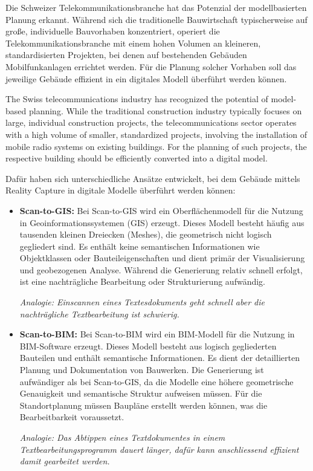 \begin{German}
    Die Schweizer Telekommunikationsbranche hat das Potenzial der modellbasierten Planung erkannt. Während sich die traditionelle Bauwirtschaft typischerweise auf große, individuelle Bauvorhaben konzentriert, operiert die Telekommunikationsbranche mit einem hohen Volumen an kleineren, standardisierten Projekten, bei denen auf bestehenden Gebäuden Mobilfunkanlagen errichtet werden. Für die Planung solcher Vorhaben soll das jeweilige Gebäude effizient in ein digitales Modell überführt werden können.
\end{German}

\begin{English}
    The Swiss telecommunications industry has recognized the potential of model-based planning. While the traditional construction industry typically focuses on large, individual construction projects, the telecommunications sector operates with a high volume of smaller, standardized projects, involving the installation of mobile radio systems on existing buildings. For the planning of such projects, the respective building should be efficiently converted into a digital model.
\end{English}

\begin{German}
    Dafür haben sich unterschiedliche Ansätze entwickelt, bei dem Gebäude mittels Reality Capture in digitale Modelle überführt werden können:

    \begin{itemize}
        \item \textbf{Scan-to-GIS:} Bei Scan-to-GIS wird ein Oberflächenmodell für die Nutzung in Geoinformationssystemen (GIS) erzeugt. Dieses Modell besteht häufig aus tausenden kleinen Dreiecken (Meshes), die geometrisch nicht logisch gegliedert sind. Es enthält keine semantischen Informationen wie Objektklassen oder Bauteileigenschaften und dient primär der Visualisierung und geobezogenen Analyse. Während die Generierung relativ schnell erfolgt, ist eine nachträgliche Bearbeitung oder Strukturierung aufwändig.
        
        \textit{Analogie: Einscannen eines Textesdokuments geht schnell aber die nachträgliche Textbearbeitung ist schwierig.}

        \item \textbf{Scan-to-BIM:} Bei Scan-to-BIM wird ein BIM-Modell für die Nutzung in BIM-Software erzeugt. Dieses Modell besteht aus logisch gegliederten Bauteilen und enthält semantische Informationen. Es dient der detaillierten Planung und Dokumentation von Bauwerken. Die Generierung ist aufwändiger als bei Scan-to-GIS, da die Modelle eine höhere geometrische Genauigkeit und semantische Struktur aufweisen müssen. Für die Standortplanung müssen Baupläne erstellt werden können, was die Bearbeitbarkeit voraussetzt. 
        
        \textit{Analogie: Das Abtippen eines Textdokumentes in einem Textbearbeitungsprogramm dauert länger, dafür kann anschliessend effizient damit gearbeitet werden.} 
    \end{itemize}
\end{German}


